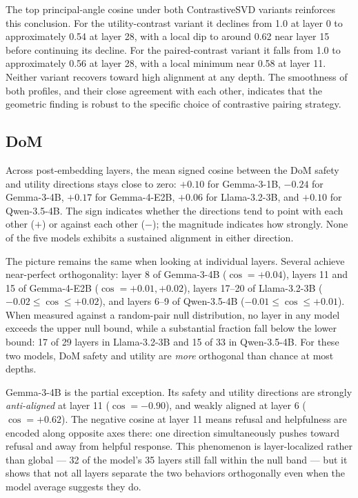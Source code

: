 The top principal-angle cosine under both ContrastiveSVD variants
reinforces this conclusion. For the utility-contrast variant it
declines from 1.0 at layer 0 to approximately 0.54 at layer 28,
with a local dip to around 0.62 near layer 15 before continuing
its decline. For the paired-contrast variant it falls from 1.0 to
approximately 0.56 at layer 28, with a local minimum near 0.58 at
layer 11. Neither variant recovers toward high alignment at any
depth. The smoothness of both profiles, and their close agreement
with each other, indicates that the geometric finding is robust
to the specific choice of contrastive pairing strategy.

\subsection{DoM}
\label{sec:results-dom}

Across post-embedding layers, the mean signed cosine between the
DoM safety and utility directions stays close to zero: $+0.10$ for
Gemma-3-1B, $-0.24$ for Gemma-3-4B, $+0.17$ for Gemma-4-E2B, $+0.06$
for Llama-3.2-3B, and $+0.10$ for Qwen-3.5-4B. The sign indicates
whether the directions tend to point with each other ($+$) or
against each other ($-$); the magnitude indicates how strongly. None
of the five models exhibits a sustained alignment in either
direction.

The picture remains the same when looking at individual layers.
Several achieve near-perfect orthogonality: layer 8 of Gemma-3-4B
($\cos = +0.04$), layers 11 and 15 of Gemma-4-E2B ($\cos = +0.01,
+0.02$), layers 17--20 of Llama-3.2-3B ($-0.02 \le \cos \le +0.02$),
and layers 6--9 of Qwen-3.5-4B ($-0.01 \le \cos \le +0.01$). When
measured against a random-pair null distribution, no layer in any
model exceeds the upper null bound, while a substantial fraction
fall below the lower bound: 17 of 29 layers in Llama-3.2-3B and 15
of 33 in Qwen-3.5-4B. For these two models, DoM safety and utility
are \emph{more} orthogonal than chance at most depths.

Gemma-3-4B is the partial exception. Its safety and utility
directions are strongly \emph{anti-aligned} at layer 11
($\cos = -0.90$), and weakly aligned at layer 6 ($\cos = +0.62$).
The negative cosine at layer 11 means refusal and helpfulness are
encoded along opposite axes there: one direction simultaneously
pushes toward refusal and away from helpful response. This
phenomenon is layer-localized rather than global --- 32 of the
model's 35 layers still fall within the null band --- but it shows
that not all layers separate the two behaviors orthogonally even
when the model average suggests they do.

